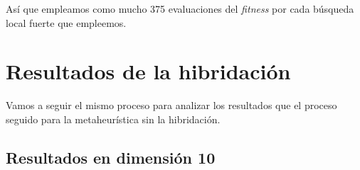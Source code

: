 \documentclass[11pt]{article}
\begin{document}
\begin{table}[H]
    \centering
    \caption{\emph{Parameter Tuning} para el máximo de evaluaciones por cada búsqueda local fuerte}
\end{table}

Así que empleamos como mucho 375 evaluaciones del \emph{fitness} por cada búsqueda local fuerte que empleemos.

\pagebreak
\section{Resultados de la hibridación}

Vamos a seguir el mismo proceso para analizar los resultados que el proceso seguido para la metaheurística sin la hibridación.

\subsection{Resultados en dimensión 10}
\end{document}

